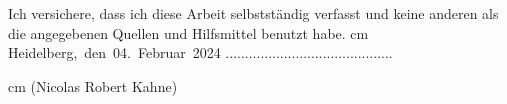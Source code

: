 


\cleardoublepage

\def\makeheadline{}

\rule{0cm}{5cm}

\bigskip
\noindent Ich versichere, dass ich diese Arbeit selbstst\"{a}ndig verfasst und keine anderen als die angegebenen Quellen und Hilfsmittel benutzt habe.  cm \noindent
\hbox{Heidelberg, den 04. Februar 2024}\hfill{ 
	...........................................}

 cm (Nicolas Robert Kahne)


